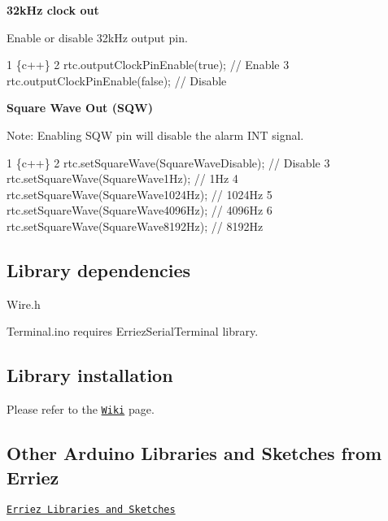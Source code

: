 {\bfseries 32k\+Hz clock out}

Enable or disable {\ttfamily 32k\+Hz} output pin.


\begin{DoxyCode}
1 \{c++\}
2 rtc.outputClockPinEnable(true);     // Enable 
3 rtc.outputClockPinEnable(false);    // Disable
\end{DoxyCode}


{\bfseries Square Wave Out (S\+QW)}

Note\+: Enabling {\ttfamily S\+QW} pin will disable the alarm {\ttfamily I\+NT} signal.


\begin{DoxyCode}
1 \{c++\}
2 rtc.setSquareWave(SquareWaveDisable);   // Disable
3 rtc.setSquareWave(SquareWave1Hz);       // 1Hz
4 rtc.setSquareWave(SquareWave1024Hz);    // 1024Hz
5 rtc.setSquareWave(SquareWave4096Hz);    // 4096Hz
6 rtc.setSquareWave(SquareWave8192Hz);    // 8192Hz
\end{DoxyCode}


\subsection*{Library dependencies}


\begin{DoxyItemize}
\item {\ttfamily Wire.\+h}
\item {\ttfamily Terminal.\+ino} requires {\ttfamily Erriez\+Serial\+Terminal} library.
\end{DoxyItemize}

\subsection*{Library installation}

Please refer to the \href{https://github.com/Erriez/ErriezArduinoLibrariesAndSketches/wiki}{\tt Wiki} page.

\subsection*{Other Arduino Libraries and Sketches from Erriez}


\begin{DoxyItemize}
\item \href{https://github.com/Erriez/ErriezArduinoLibrariesAndSketches}{\tt Erriez Libraries and Sketches} 
\end{DoxyItemize}
